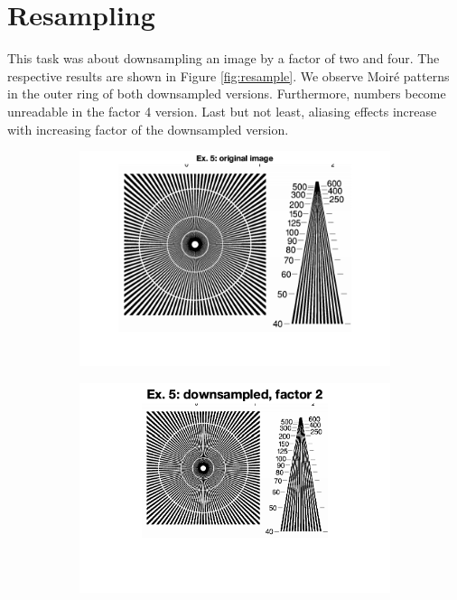 \documentclass{article}
\begin{document}
\section{Resampling}
This task was about downsampling an image by a factor of two and four. The respective results are shown in Figure \ref{fig:resample}. We observe Moiré patterns in the outer ring of both downsampled versions. Furthermore, numbers become unreadable in the factor 4 version. Last but not least, aliasing effects increase with increasing factor of the downsampled version.

\begin{figure}
    \centering
    \begin{subfigure}[c]{0.3\textwidth}
        \includegraphics[width=\textwidth]{images/ex5.png}
    \end{subfigure}
    \hfill
    \begin{subfigure}[c]{0.3\textwidth}
        \includegraphics[width=\textwidth]{images/ex5_2.png}

\end{subfigure}
\end{figure}
\end{document}
